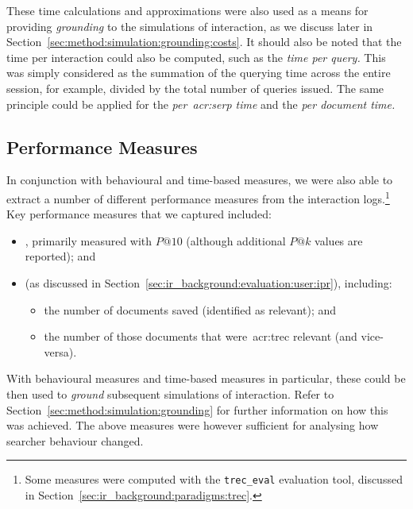 These time calculations and approximations were also used as a means for providing \emph{grounding} to the simulations of interaction, as we discuss later in Section~\ref{sec:method:simulation:grounding:costs}. It should also be noted that the time per interaction could also be computed, such as the \emph{time per query.} This was simply considered as the summation of the querying time across the entire session, for example, divided by the total number of queries issued. The same principle could be applied for the \emph{per~\gls{acr:serp} time} and the \emph{per document time.}

\subsection{Performance Measures}\label{sec:methodology:extracting:performance}
In conjunction with behavioural and time-based measures, we were also able to extract a number of different performance measures from the interaction logs.\footnote{Some measures were computed with the \texttt{trec\_eval} evaluation tool, discussed in Section~\ref{sec:ir_background:paradigms:trec}.} Key performance measures that we captured included:

\begin{itemize}
    \item{, primarily measured with $P@10$ (although additional $P@k$ values are reported); and}
    \item{ (as discussed in Section~\ref{sec:ir_background:evaluation:user:ipr}), including:}
    
    \begin{itemize}
        \item{the number of documents saved (identified as relevant); and}
        \item{the number of those documents that were~\gls{acr:trec} relevant (and vice-versa).}
    \end{itemize}
\end{itemize}

 With behavioural measures and time-based measures in particular, these could be then used to \emph{ground} subsequent simulations of interaction. Refer to Section~\ref{sec:method:simulation:grounding} for further information on how this was achieved. The above measures were however sufficient for analysing how searcher behaviour changed.

